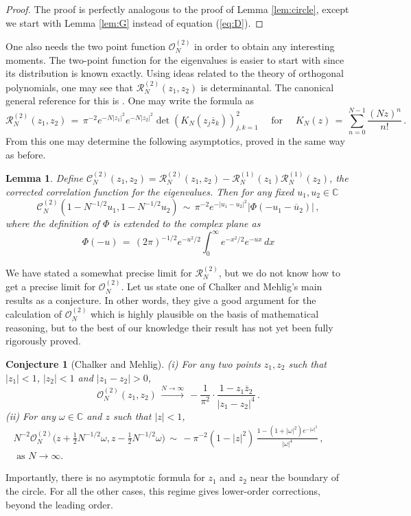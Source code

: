 \documentclass[12pt]{report}
\newtheorem{lemma}[theorem]{Lemma}
\newtheorem{conj}[theorem]{Conjecture}
\newcommand{\C}{\mathbb{C}}
\newcommand{\be}{\begin{equation}}
\newcommand{\ee}{\end{equation}}
\theoremstyle{definition}
\begin{document}
\begin{proof}
The proof is perfectly analogous to the proof of Lemma \ref{lem:circle}, except we start with Lemma \ref{lem:G} instead of equation (\ref{eq:D}).
\end{proof}
One also needs the two point function $\mathcal{O}_N^{(2)}$ in order to obtain any interesting moments.
The two-point function for the eigenvalues is easier to start with since its distribution is known exactly.
Using ideas related to the theory of orthogonal polynomials, one may see that $\mathcal{R}_N^{(2)}(z_1,z_2)$ is determinantal.
The canonical general reference for this is \cite{Mehta}.
One may write the formula as 
\be
\mathcal{R}_N^{(2)}(z_1,z_2)\, =\, \pi^{-2} e^{-N|z_1|^2} e^{-N|z_2|^2}
\det\left(K_N(z_j \overline{z}_k)\right)_{j,k=1}^{2}\quad \text{ for }\quad
K_N(z)\, =\, \sum_{n=0}^{N-1} \frac{(Nz)^n}{n!}\, .
\ee
From this one may determine the following asymptotics, proved in the same way as before.
\begin{lemma}
Define $\mathcal{C}_N^{(2)}(z_1,z_2) = \mathcal{R}_N^{(2)}(z_1,z_2) - \mathcal{R}_N^{(1)}(z_1) \mathcal{R}_N^{(1)}(z_2)$,
the corrected correlation function for the eigenvalues.
Then for any fixed $u_1,u_2 \in \C$
\be
\mathcal{C}_N^{(2)}(1-N^{-1/2}u_1,1-N^{-1/2}u_2)\, 
\sim\, \pi^{-2} e^{-|u_1-u_2|^2} |\Phi(-u_1-\overline{u}_2)|\, ,
\ee
where the definition of $\Phi$ is extended to the complex plane as $$\Phi(-u)\, =\, (2\pi)^{-1/2} e^{-u^2/2} \int_{0}^{\infty} e^{-x^2/2} e^{-ux}\, dx$$
\end{lemma}
We have stated a somewhat precise limit for $\mathcal{R}_N^{(2)}$, but we do not know how to get a precise limit for $\mathcal{O}_N^{(2)}$.
Let us state one of Chalker and Mehlig's main results as a conjecture. In other words, they give a good argument for the calculation of $\mathcal{O}_N^{(2)}$
which is highly plausible on the basis of mathematical reasoning, but to the best of our knowledge their result has not yet been fully rigorously proved.
\begin{conj}[Chalker and Mehlig]
(i) For any two points $z_1,z_2$ such that $|z_1|<1$, $|z_2|<1$ and $|z_1-z_2|>0$,
\be
\mathcal{O}_N^{(2)}(z_1,z_2)\, \stackrel{N\to\infty}{\longrightarrow}\,
-\frac{1}{\pi^2}\cdot \frac{1-z_1\overline{z}_2}{|z_1-z_2|^4}\, .
\ee
(ii)
For any $\omega \in \C$ and $z$ such that $|z|<1$,
\begin{multline}
\label{eq:CM2}
N^{-2} \mathcal{O}_N^{(2)}\Big(z+\frac{1}{2}N^{-1/2}\omega,z-\frac{1}{2}N^{-1/2}\omega\Big)\,
\sim\, -\pi^{-2} (1-|z|^2)\, \frac{1-(1+|\omega|^2)e^{-|\omega|^2}}{|\omega|^4}\, ,\qquad \\ \text{ as $N \to \infty$.}
\end{multline}
\end{conj}
Importantly, there is no asymptotic formula for $z_1$ and $z_2$ near the boundary of the circle.
For all the other cases, this regime gives lower-order corrections, beyond the leading order.
\end{document}
